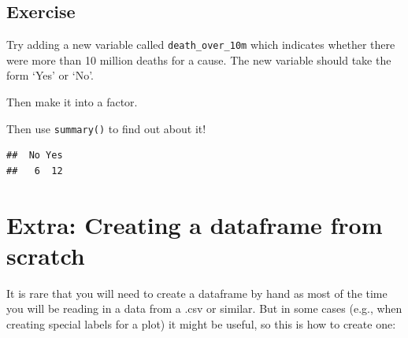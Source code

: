 \documentclass[]{book}
\makeatletter
\newenvironment{Shaded}{\begin{snugshade}}{\end{snugshade}}
\newcommand{\KeywordTok}[1]{\textcolor[rgb]{0.13,0.29,0.53}{\textbf{#1}}}
\newcommand{\DataTypeTok}[1]{\textcolor[rgb]{0.13,0.29,0.53}{#1}}
\newcommand{\DecValTok}[1]{\textcolor[rgb]{0.00,0.00,0.81}{#1}}
\newcommand{\StringTok}[1]{\textcolor[rgb]{0.31,0.60,0.02}{#1}}
\newcommand{\CommentTok}[1]{\textcolor[rgb]{0.56,0.35,0.01}{\textit{#1}}}
\newcommand{\OperatorTok}[1]{\textcolor[rgb]{0.81,0.36,0.00}{\textbf{#1}}}
\newcommand{\NormalTok}[1]{#1}
\newenvironment{kframe}{%
\medskip{}
\setlength{\fboxsep}{.8em}
 \def\at@end@of@kframe{}%
 \ifinner\ifhmode%
  \def\at@end@of@kframe{\end{minipage}}%
  \begin{minipage}{\columnwidth}%
 \fi\fi%
 \def\FrameCommand##1{\hskip\@totalleftmargin \hskip-\fboxsep
 \colorbox{shadecolor}{##1}\hskip-\fboxsep
     \hskip-\linewidth \hskip-\@totalleftmargin \hskip\columnwidth}%
 \MakeFramed {\advance\hsize-\width
   \@totalleftmargin\z@ \linewidth\hsize
   \@setminipage}}%
 {\par\unskip\endMakeFramed%
 \at@end@of@kframe}
\renewenvironment{Shaded}{\begin{kframe}}{\end{kframe}}
\makeatother
\begin{document}
\subsection{Exercise}\label{exercise-14}

Try adding a new variable called \texttt{death\_over\_10m} which
indicates whether there were more than 10 million deaths for a cause.
The new variable should take the form `Yes' or `No'.

Then make it into a factor.

Then use \texttt{summary()} to find out about it!

\begin{Shaded}
\end{Shaded}

\begin{verbatim}
##  No Yes 
##   6  12
\end{verbatim}

\section{Extra: Creating a dataframe from
scratch}\label{extra-creating-a-dataframe-from-scratch}

It is rare that you will need to create a dataframe by hand as most of
the time you will be reading in a data from a .csv or similar. But in
some cases (e.g., when creating special labels for a plot) it might be
useful, so this is how to create one:
\end{document}
